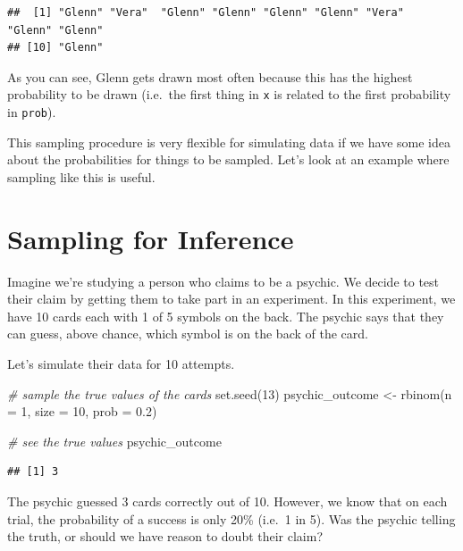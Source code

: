 \documentclass[
]{book}
\newenvironment{Shaded}{\begin{snugshade}}{\end{snugshade}}
\newcommand{\AttributeTok}[1]{\textcolor[rgb]{0.77,0.63,0.00}{#1}}
\newcommand{\CommentTok}[1]{\textcolor[rgb]{0.56,0.35,0.01}{\textit{#1}}}
\newcommand{\DecValTok}[1]{\textcolor[rgb]{0.00,0.00,0.81}{#1}}
\newcommand{\FloatTok}[1]{\textcolor[rgb]{0.00,0.00,0.81}{#1}}
\newcommand{\FunctionTok}[1]{\textcolor[rgb]{0.00,0.00,0.00}{#1}}
\newcommand{\NormalTok}[1]{#1}
\newcommand{\OtherTok}[1]{\textcolor[rgb]{0.56,0.35,0.01}{#1}}
\begin{document}
\begin{verbatim}
##  [1] "Glenn" "Vera"  "Glenn" "Glenn" "Glenn" "Glenn" "Vera"  "Glenn" "Glenn"
## [10] "Glenn"
\end{verbatim}

As you can see, Glenn gets drawn most often because this has the highest probability to be drawn (i.e.~the first thing in \texttt{x} is related to the first probability in \texttt{prob}).

This sampling procedure is very flexible for simulating data if we have some idea about the probabilities for things to be sampled. Let's look at an example where sampling like this is useful.

\hypertarget{sampling-for-inference}{%
\section{Sampling for Inference}\label{sampling-for-inference}}

Imagine we're studying a person who claims to be a psychic. We decide to test their claim by getting them to take part in an experiment. In this experiment, we have 10 cards each with 1 of 5 symbols on the back. The psychic says that they can guess, above chance, which symbol is on the back of the card.

Let's simulate their data for 10 attempts.

\begin{Shaded}
\begin{Highlighting}[]
\CommentTok{\# sample the true values of the cards}
\FunctionTok{set.seed}\NormalTok{(}\DecValTok{13}\NormalTok{)}
\NormalTok{psychic\_outcome }\OtherTok{\textless{}{-}} \FunctionTok{rbinom}\NormalTok{(}\AttributeTok{n =} \DecValTok{1}\NormalTok{, }\AttributeTok{size =} \DecValTok{10}\NormalTok{, }\AttributeTok{prob =} \FloatTok{0.2}\NormalTok{)}

\CommentTok{\# see the true values}
\NormalTok{psychic\_outcome}
\end{Highlighting}
\end{Shaded}

\begin{verbatim}
## [1] 3
\end{verbatim}

The psychic guessed 3 cards correctly out of 10. However, we know that on each trial, the probability of a success is only 20\% (i.e.~1 in 5). Was the psychic telling the truth, or should we have reason to doubt their claim?
\end{document}

